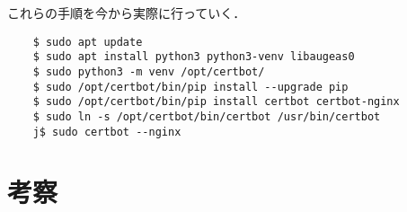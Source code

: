 \documentclass[divpdfmx]{jlreq}
\begin{document}
これらの手順を今から実際に行っていく．
\begin{lstlisting}
    $ sudo apt update
    $ sudo apt install python3 python3-venv libaugeas0
    $ sudo python3 -m venv /opt/certbot/
    $ sudo /opt/certbot/bin/pip install --upgrade pip
    $ sudo /opt/certbot/bin/pip install certbot certbot-nginx
    $ sudo ln -s /opt/certbot/bin/certbot /usr/bin/certbot
    j$ sudo certbot --nginx
\end{lstlisting}
\section{考察}
\end{document}
